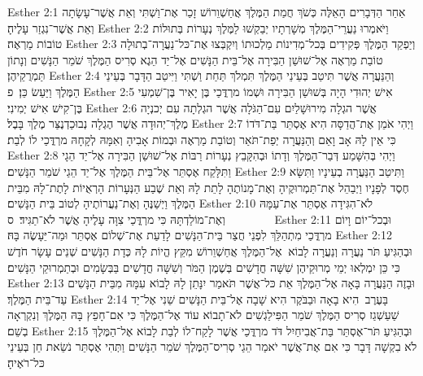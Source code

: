 Esther 2:1	אַחַר הַדְּבָרִים הָאֵלֶּה כְּשֹׁךְ חֲמַת הַמֶּלֶךְ אֲחַשְׁוֵרוֹשׁ זָכַר אֶת־וַשְׁתִּי וְאֵת אֲשֶׁר־עָשָׂתָה וְאֵת אֲשֶׁר־נִגְזַר עָלֶיהָ׃
Esther 2:2	וַיֹּאמְרוּ נַעֲרֵי־הַמֶּלֶךְ מְשָׁרְתָיו יְבַקְשׁוּ לַמֶּלֶךְ נְעָרוֹת בְּתוּלוֹת טוֹבוֹת מַרְאֶה׃
Esther 2:3	וְיַפְקֵד הַמֶּלֶךְ פְּקִידִים בְּכל־מְדִינוֹת מַלְכוּתוֹ וְיִקְבְּצוּ אֶת־כּל־נַעֲרָה־בְתוּלָה טוֹבַת מַרְאֶה אֶל־שׁוּשַׁן הַבִּירָה אֶל־בֵּית הַנָּשִׁים אֶל־יַד הֵגֶא סְרִיס הַמֶּלֶךְ שֹׁמֵר הַנָּשִׁים וְנָתוֹן תַּמְרֻקֵיהֶן׃
Esther 2:4	וְהַנַּעֲרָה אֲשֶׁר תִּיטַב בְּעֵינֵי הַמֶּלֶךְ תִּמְלֹךְ תַּחַת וַשְׁתִּי וַיִּיטַב הַדָּבָר בְּעֵינֵי הַמֶּלֶךְ וַיַּעַשׂ כֵּן׃ {פ}
Esther 2:5	אִישׁ יְהוּדִי הָיָה בְּשׁוּשַׁן הַבִּירָה וּשְׁמוֹ מרְדֳּכַי בֶּן יָאִיר בֶּן־שִׁמְעִי בֶּן־קִישׁ אִישׁ יְמִינִי׃
Esther 2:6	אֲשֶׁר הגְלָה מִירוּשָׁלַיִם עִם־הַגֹּלָה אֲשֶׁר הגְלְתָה עִם יְכנְיָה מֶלֶךְ־יְהוּדָה אֲשֶׁר הֶגְלָה נְבוּכַדְנֶצַּר מֶלֶךְ בָּבֶל׃
Esther 2:7	וַיְהִי אֹמֵן אֶת־הֲדַסָּה הִיא אֶסְתֵּר בַּת־דֹּדוֹ כִּי אֵין לָהּ אָב וָאֵם וְהַנַּעֲרָה יְפַת־תֹּאַר וְטוֹבַת מַרְאֶה וּבְמוֹת אָבִיהָ וְאִמָּהּ לְקָחָהּ מרְדֳּכַי לוֹ לְבַת׃
Esther 2:8	וַיְהִי בְּהִשָּׁמַע דְּבַר־הַמֶּלֶךְ וְדָתוֹ וּבְהִקָּבֵץ נְעָרוֹת רַבּוֹת אֶל־שׁוּשַׁן הַבִּירָה אֶל־יַד הֵגָי וַתִּלָּקַח אֶסְתֵּר אֶל־בֵּית הַמֶּלֶךְ אֶל־יַד הֵגַי שֹׁמֵר הַנָּשִׁים׃
Esther 2:9	וַתִּיטַב הַנַּעֲרָה בְעֵינָיו וַתִּשָּׂא חֶסֶד לְפָנָיו וַיְבַהֵל אֶת־תַּמְרוּקֶיהָ וְאֶת־מָנוֹתֶהָ לָתֵת לָהּ וְאֵת שֶׁבַע הַנְּעָרוֹת הָרְאֻיוֹת לָתֶת־לָהּ מִבֵּית הַמֶּלֶךְ וַיְשַׁנֶּהָ וְאֶת־נַעֲרוֹתֶיהָ לְטוֹב בֵּית הַנָּשִׁים׃
Esther 2:10	לֹא־הִגִּידָה אֶסְתֵּר אֶת־עַמָּהּ וְאֶת־מוֹלַדְתָּהּ כִּי מרְדֳּכַי צִוָּה עָלֶיהָ אֲשֶׁר לֹא־תַגִּיד׃ {ס}        
Esther 2:11	וּבְכל־יוֹם וָיוֹם מרְדֳּכַי מִתְהַלֵּךְ לִפְנֵי חֲצַר בֵּית־הַנָּשִׁים לָדַעַת אֶת־שְׁלוֹם אֶסְתֵּר וּמַה־יֵּעָשֶׂה בָּהּ׃
Esther 2:12	וּבְהַגִּיעַ תֹּר נַעֲרָה וְנַעֲרָה לָבוֹא  אֶל־הַמֶּלֶךְ אֲחַשְׁוֵרוֹשׁ מִקֵּץ הֱיוֹת לָהּ כְּדָת הַנָּשִׁים שְׁנֵים עָשָׂר חֹדֶשׁ כִּי כֵּן יִמְלְאוּ יְמֵי מְרוּקֵיהֶן שִׁשָּׁה חֳדָשִׁים בְּשֶׁמֶן הַמֹּר וְשִׁשָּׁה חֳדָשִׁים בַּבְּשָׂמִים וּבְתַמְרוּקֵי הַנָּשִׁים׃
Esther 2:13	וּבָזֶה הַנַּעֲרָה בָּאָה אֶל־הַמֶּלֶךְ אֵת כּל־אֲשֶׁר תֹּאמַר יִנָּתֵן לָהּ לָבוֹא עִמָּהּ מִבֵּית הַנָּשִׁים עַד־בֵּית הַמֶּלֶךְ׃
Esther 2:14	בָּעֶרֶב  הִיא בָאָה וּבַבֹּקֶר הִיא שָׁבָה אֶל־בֵּית הַנָּשִׁים שֵׁנִי אֶל־יַד שַׁעַשְׁגַז סְרִיס הַמֶּלֶךְ שֹׁמֵר הַפִּילַגְשִׁים לֹא־תָבוֹא עוֹד אֶל־הַמֶּלֶךְ כִּי אִם־חָפֵץ בָּהּ הַמֶּלֶךְ וְנִקְרְאָה בְשֵׁם׃
Esther 2:15	וּבְהַגִּיעַ תֹּר־אֶסְתֵּר בַּת־אֲבִיחַיִל דֹּד מרְדֳּכַי אֲשֶׁר לָקַח־לוֹ לְבַת לָבוֹא אֶל־הַמֶּלֶךְ לֹא בִקְשָׁה דָּבָר כִּי אִם אֶת־אֲשֶׁר יֹאמַר הֵגַי סְרִיס־הַמֶּלֶךְ שֹׁמֵר הַנָּשִׁים וַתְּהִי אֶסְתֵּר נֹשֵׂאת חֵן בְּעֵינֵי כּל־רֹאֶיהָ׃
